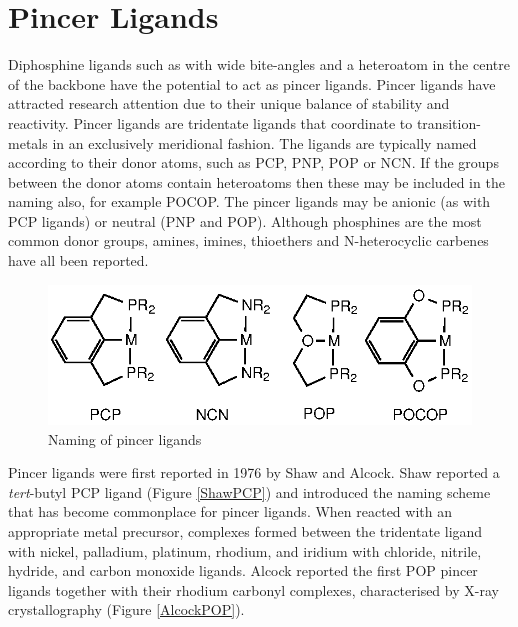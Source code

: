 \section{Pincer Ligands}

Diphosphine ligands such as \Phxantphos{} with wide bite-angles and a heteroatom in the centre of the backbone have the potential to act as pincer ligands.  Pincer ligands have attracted research attention due to their unique balance of stability and reactivity.\cite{Becerra2009}  Pincer ligands are tridentate ligands that coordinate to transition-metals in an exclusively meridional fashion.\cite{Choi2011}   The ligands are typically named according to their donor atoms, such as PCP, PNP, POP or NCN.  If the groups between the donor atoms contain heteroatoms then these may be included in the naming also, for example POCOP.  The pincer ligands may be anionic (as with PCP ligands) or neutral (PNP and POP).\cite{Vlugt2009, Kataoka1995}  Although phosphines are the most common donor groups, amines,\cite{Singleton2003} imines,\cite{Takenaka2005} thioethers\cite{Zim2000} and N-heterocyclic carbenes\cite{Hahn2007} have all been reported.

\begin{figure}[ht]
\centering
\includegraphics[]{../Figures/Pincernaming.eps}
\caption[Naming of pincer ligands]{Naming of pincer ligands}
\label{Pincernaming}
\end{figure}

Pincer ligands were first reported in 1976 by Shaw and Alcock.\cite{Moulton1976, Alcock1976}  Shaw reported a \emph{tert}-butyl PCP ligand (Figure \ref{ShawPCP}) and introduced the naming scheme that has become commonplace for pincer ligands.  When reacted with an appropriate metal precursor, complexes formed between the tridentate ligand with nickel, palladium, platinum, rhodium, and iridium with chloride, nitrile, hydride, and carbon monoxide ligands.\cite{Moulton1976}  Alcock reported the first POP pincer ligands together with their rhodium carbonyl complexes, characterised by X-ray crystallography (Figure \ref{AlcockPOP}).\cite{Alcock1976}  

